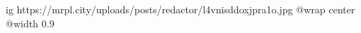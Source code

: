  
 
 
 
 

\ifcmt
  ig https://mrpl.city/uploads/posts/redactor/l4vnisddoxjpra1o.jpg
  @wrap center
  @width 0.9
\fi
